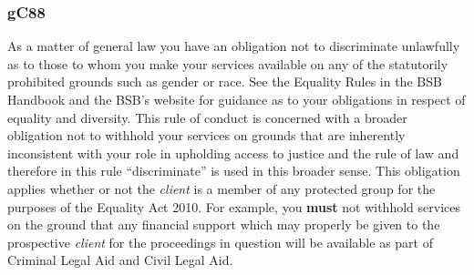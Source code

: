 

\subsubsection{\color{darkgrey}gC88}

As a matter of general law you have an obligation not to discriminate
unlawfully as to those to whom you make your services available on any
of the statutorily prohibited grounds such as gender or race. See the
Equality Rules in the BSB Handbook and the BSB's website for guidance as
to your obligations in respect of equality and diversity. This rule of
conduct is concerned with a broader obligation not to withhold your
services on grounds that are inherently inconsistent with your role in
upholding access to justice and the rule of law and therefore in this
rule ``discriminate'' is used in this broader sense. This obligation
applies whether or not the \emph{client} is a member of any protected
group for the purposes of the Equality Act 2010. For example, you \textcolor{myred}{\textbf{must} not}
 withhold services on the ground that any financial support which may
properly be given to the prospective \emph{client} for the proceedings
in question will be available as part of Criminal Legal Aid and Civil
Legal Aid.




